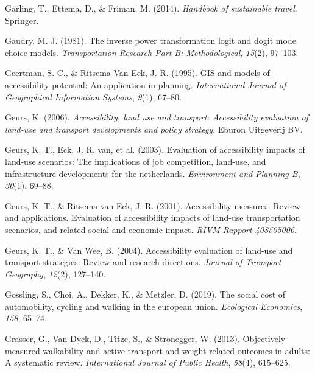 \documentclass[
11pt, %
oneside, %
english, %
singlespacing, %
]{macthesis} %
\newlength{\cslhangindent}
\newenvironment{CSLReferences}[2] %
 {%
  \setlength{\parindent}{0pt}
  \ifodd #1 \everypar{\setlength{\hangindent}{\cslhangindent}}\ignorespaces\fi
  \ifnum #2 > 0
  \setlength{\parskip}{#2\baselineskip}
  \fi
 }%
 {}
\begin{document}
\begin{CSLReferences}{1}{0}
\leavevmode{}%
Garling, T., Ettema, D., \& Friman, M. (2014). \emph{Handbook of sustainable travel}. Springer.

\leavevmode{}%
Gaudry, M. J. (1981). The inverse power transformation logit and dogit mode choice models. \emph{Transportation Research Part B: Methodological}, \emph{15}(2), 97--103.

\leavevmode{}%
Geertman, S. C., \& Ritsema Van Eck, J. R. (1995). GIS and models of accessibility potential: An application in planning. \emph{International Journal of Geographical Information Systems}, \emph{9}(1), 67--80.

\leavevmode{}%
Geurs, K. (2006). \emph{Accessibility, land use and transport: Accessibility evaluation of land-use and transport developments and policy strategy}. Eburon Uitgeverij BV.

\leavevmode{}%
Geurs, K. T., Eck, J. R. van, et al. (2003). Evaluation of accessibility impacts of land-use scenarios: The implications of job competition, land-use, and infrastructure developments for the netherlands. \emph{Environment and Planning B}, \emph{30}(1), 69--88.

\leavevmode{}%
Geurs, K. T., \& Ritsema van Eck, J. R. (2001). Accessibility measures: Review and applications. Evaluation of accessibility impacts of land-use transportation scenarios, and related social and economic impact. \emph{RIVM Rapport 408505006}.

\leavevmode{}%
Geurs, K. T., \& Van Wee, B. (2004). Accessibility evaluation of land-use and transport strategies: Review and research directions. \emph{Journal of Transport Geography}, \emph{12}(2), 127--140.

\leavevmode{}%
Gossling, S., Choi, A., Dekker, K., \& Metzler, D. (2019). The social cost of automobility, cycling and walking in the european union. \emph{Ecological Economics}, \emph{158}, 65--74.

\leavevmode{}%
Grasser, G., Van Dyck, D., Titze, S., \& Stronegger, W. (2013). Objectively measured walkability and active transport and weight-related outcomes in adults: A systematic review. \emph{International Journal of Public Health}, \emph{58}(4), 615--625.


\end{CSLReferences}
\end{document}

